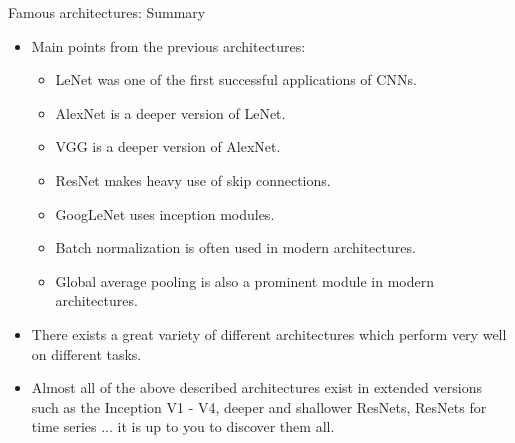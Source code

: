 \begin{vbframe}{Famous architectures: Summary}
  \begin{itemize}
    \item Main points from the previous architectures:
    \begin{itemize}
        \item LeNet was one of the first successful applications of CNNs.
        \item AlexNet is a deeper version of LeNet.
        \item VGG is a deeper version of AlexNet.
        \item ResNet makes heavy use of skip connections.
        \item GoogLeNet uses inception modules.
        \item Batch normalization is often used in modern architectures.
        \item Global average pooling is also a prominent module in modern architectures.
    \end{itemize}
    \item There exists a great variety of different architectures which perform very well on different tasks.
    \item Almost all of the above described architectures exist in extended versions such as the Inception V1 - V4, deeper and shallower ResNets, ResNets for time series ... it is up to you to discover them all.
  \end{itemize}
\end{vbframe}


